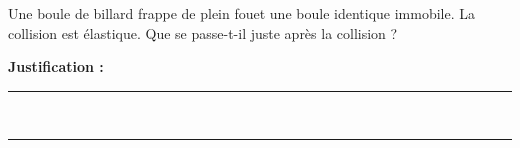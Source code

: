 Une boule de billard frappe de plein fouet une boule identique immobile. La collision est élastique. Que se passe-t-il juste après la collision ?

\choices

\noindent\textbf{Justification :} \hrulefill \\[2.5ex]
\rule{\linewidth}{0.4pt} \\[2.5ex]
\rule{\linewidth}{0.4pt}
\vfill
